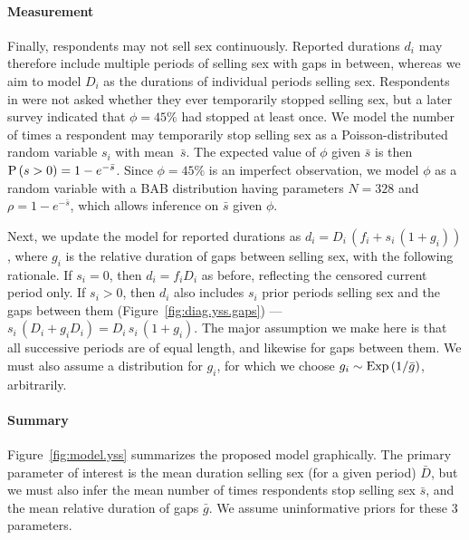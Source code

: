 \paragraph{Measurement}
Finally, respondents may not sell sex continuously.
Reported durations $d_i$ may therefore include
multiple periods of selling sex with gaps in between,
whereas we aim to model $D_i$ as the durations of individual periods selling sex.
Respondents in \cite{Baral2014} were not asked whether they ever temporarily stopped selling sex,
but a later survey \cite{EswKP2014} indicated that $\phi = 45\%$ had stopped at least once.
We model the number of times a respondent may temporarily stop selling sex as
a Poisson-distributed random variable $s_i$ with mean~$\bar{s}$.
The expected value of $\phi$ given $\bar{s}$ is then $\mathrm{P}\,(s > 0) = 1 - e^{-\bar{s}}$.
Since $\phi = 45\%$ is an imperfect observation,
we model $\phi$ as a random variable with a BAB distribution
having parameters $N = 328$ and $\rho = 1 - e^{-\bar{s}}$,
which allows inference on $\bar{s}$ given $\phi$.
\par
Next, we update the model for reported durations as $d_i = D_i\,(f_i + s_i\,(1 + g_i))$,
where $g_i$ is the relative duration of gaps between selling sex,
with the following rationale.
If $s_i = 0$, then $d_i = f_i D_i$ as before, reflecting the censored current period only.
If $s_i > 0$, then $d_i$ also includes $s_i$ prior periods selling sex and the gaps between them
(Figure~\ref{fig:diag.yss.gaps}) --- \ie $s_i\,(D_i + g_i D_i) = D_i\,s_i\,(1 + g_i)$.
The major assumption we make here is that
all successive periods are of equal length, and likewise for gaps between them.
We must also assume a distribution for $g_i$, for which we choose
$g_i \sim \mathrm{Exp}\,(1/\bar{g})$, arbitrarily.
\paragraph{Summary}
Figure~\ref{fig:model.yss} summarizes the proposed model graphically.
The primary parameter of interest is
the mean duration selling sex (for a given period) $\bar{D}$,
but we must also infer
the mean number of times respondents stop selling sex $\bar{s}$, and
the mean relative duration of gaps $\bar{g}$.
We assume uninformative priors for these 3 parameters.
